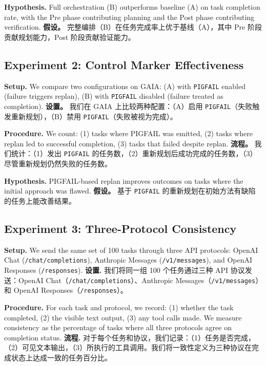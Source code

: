 \textbf{Hypothesis.} Full orchestration (B) outperforms baseline (A) on task completion rate, with the Pre phase contributing planning and the Post phase contributing verification.
\textbf{假设。} 完整编排（B）在任务完成率上优于基线（A），其中 Pre 阶段贡献规划能力，Post 阶段贡献验证能力。

\subsection{Experiment 2: Control Marker Effectiveness}

\textbf{Setup.} We compare two configurations on GAIA: (A) with \texttt{PIGFAIL} enabled (failure triggers replan), (B) with \texttt{PIGFAIL} disabled (failure treated as completion).
\textbf{设置。} 我们在 GAIA 上比较两种配置：（A）启用 \texttt{PIGFAIL}（失败触发重新规划），（B）禁用 \texttt{PIGFAIL}（失败被视为完成）。

\textbf{Procedure.} We count: (1) tasks where PIGFAIL was emitted, (2) tasks where replan led to successful completion, (3) tasks that failed despite replan.
\textbf{流程。} 我们统计：（1）发出 \texttt{PIGFAIL} 的任务数，（2）重新规划后成功完成的任务数，（3）尽管重新规划仍然失败的任务数。

\textbf{Hypothesis.} PIGFAIL-based replan improves outcomes on tasks where the initial approach was flawed.
\textbf{假设。} 基于 \texttt{PIGFAIL} 的重新规划在初始方法有缺陷的任务上能改善结果。

\subsection{Experiment 3: Three-Protocol Consistency}

\textbf{Setup.} We send the same set of 100 tasks through three API protocols: OpenAI Chat (\texttt{/chat/completions}), Anthropic Messages (\texttt{/v1/messages}), and OpenAI Responses (\texttt{/responses}).
\textbf{设置.} 我们将同一组 100 个任务通过三种 API 协议发送：OpenAI Chat（\texttt{/chat/completions}）、Anthropic Messages（\texttt{/v1/messages}）和 OpenAI Responses（\texttt{/responses}）。

\textbf{Procedure.} For each task and protocol, we record: (1) whether the task completed, (2) the visible text output, (3) any tool calls made. We measure consistency as the percentage of tasks where all three protocols agree on completion status.
\textbf{流程.} 对于每个任务和协议，我们记录：（1）任务是否完成，（2）可见文本输出，（3）所执行的工具调用。我们将一致性定义为三种协议在完成状态上达成一致的任务百分比。

